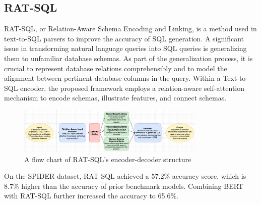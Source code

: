\subsection{RAT-SQL}

RAT-SQL, or Relation-Aware Schema Encoding and Linking\cite{wang_rat-sql_2021}, is a method used in text-to-SQL parsers to improve the accuracy of SQL generation. A significant issue in transforming natural language queries into SQL queries is generalizing them to unfamiliar database schemas. As part of the generalization process, it is crucial to represent database relations comprehensibly and to model the alignment between pertinent database columns in the query. Within a Text-to-SQL encoder, the proposed framework employs a relation-aware self-attention mechanism to encode schemas, illustrate features, and connect schemas.

\begin{figure}[htb]
    \centering
    \includegraphics[width=0.8\textwidth]{pics/RAT-SQL/flow.png}
    \caption{A flow chart of RAT-SQL's encoder-decoder structure}
    \label{fig:RAT-SQL-flow}
\end{figure}

On the SPIDER dataset, RAT-SQL achieved a 57.2\% accuracy score, which is 8.7\% higher than the accuracy of prior benchmark models. Combining BERT with RAT-SQL further increased the accuracy to 65.6\%.


